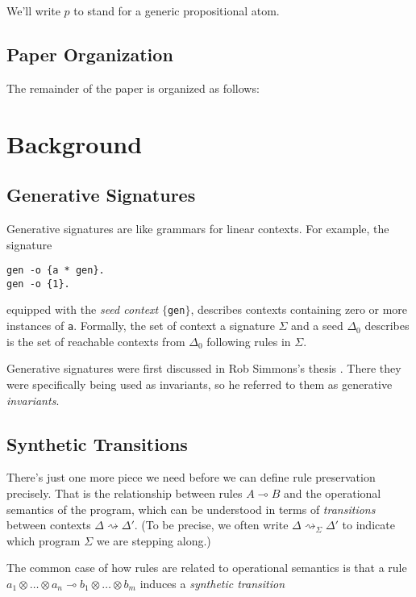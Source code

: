 \documentclass[fullpage, 11pt]{article}
\newcommand{\lolli}{\multimap}
\newcommand{\tensor}{\otimes}
\newcommand{\stepsto}{\rightsquigarrow}
\begin{document}
We'll write $p$ to stand for a generic propositional atom.

\subsection{Paper Organization}

The remainder of the paper is organized as follows: %

\section{Background}

\subsection{Generative Signatures}

Generative signatures are like grammars for linear contexts. For example,
the signature 

\begin{verbatim}
gen -o {a * gen}.
gen -o {1}.
\end{verbatim}

equipped with the {\em seed context} $\{$\verb|gen|$\}$, describes contexts
containing zero or more instances of \verb|a|. Formally, the set of context
a signature $\Sigma$ and a seed $\Delta_0$ describes is the set of
reachable contexts from $\Delta_0$ following rules in $\Sigma$.

Generative signatures were first discussed in Rob Simmons's thesis
\cite{simmons12thesis}. There they were specifically being used as invariants, so he
referred to them as generative {\em invariants}.



\subsection{Synthetic Transitions}

There's just one more piece we need before we can define rule preservation
precisely. That is the relationship between rules $A \lolli B$ and the
operational semantics of the program, which can be understood in terms of
{\em transitions} between contexts $\Delta \stepsto \Delta'$. (To be
precise, we often write $\Delta \stepsto_{\Sigma} \Delta'$ to indicate
which program $\Sigma$ we are stepping along.) 

The common case of how rules are related to operational semantics is that a
rule $a_1 \tensor \dots \tensor a_n \lolli b_1 \tensor \dots \tensor b_m$
induces a {\em synthetic transition}
\end{document}
